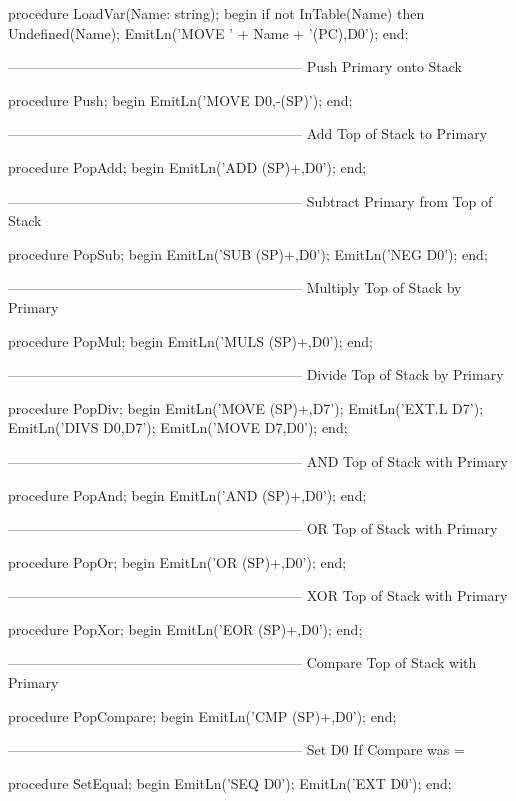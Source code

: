 \documentclass[float=false, crop=false]{standalone}
\begin{document}
\begin{code}
procedure LoadVar(Name: string);
begin
   if not InTable(Name) then Undefined(Name);
   EmitLn('MOVE ' + Name + '(PC),D0');
end;


{---------------------------------------------------------------}
{ Push Primary onto Stack }

procedure Push;
begin
   EmitLn('MOVE D0,-(SP)');
end;


{---------------------------------------------------------------}
{ Add Top of Stack to Primary }

procedure PopAdd;
begin
   EmitLn('ADD (SP)+,D0');
end;


{---------------------------------------------------------------}
{ Subtract Primary from Top of Stack }

procedure PopSub;
begin
   EmitLn('SUB (SP)+,D0');
   EmitLn('NEG D0');
end;


{---------------------------------------------------------------}
{ Multiply Top of Stack by Primary }

procedure PopMul;
begin
   EmitLn('MULS (SP)+,D0');
end;


{---------------------------------------------------------------}
{ Divide Top of Stack by Primary }

procedure PopDiv;
begin
   EmitLn('MOVE (SP)+,D7');
   EmitLn('EXT.L D7');
   EmitLn('DIVS D0,D7');
   EmitLn('MOVE D7,D0');
end;


{---------------------------------------------------------------}
{ AND Top of Stack with Primary }

procedure PopAnd;
begin
   EmitLn('AND (SP)+,D0');
end;


{---------------------------------------------------------------}
{ OR Top of Stack with Primary }

procedure PopOr;
begin
   EmitLn('OR (SP)+,D0');
end;


{---------------------------------------------------------------}
{ XOR Top of Stack with Primary }

procedure PopXor;
begin
   EmitLn('EOR (SP)+,D0');
end;


{---------------------------------------------------------------}
{ Compare Top of Stack with Primary }

procedure PopCompare;
begin
   EmitLn('CMP (SP)+,D0');
end;


{---------------------------------------------------------------}
{ Set D0 If Compare was = }

procedure SetEqual;
begin
   EmitLn('SEQ D0');
   EmitLn('EXT D0');
end;



\end{code}
\end{document}
